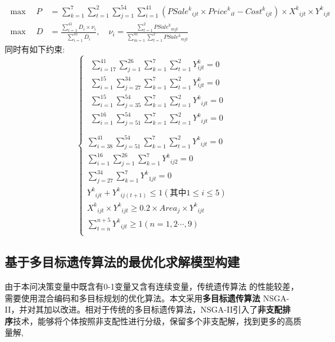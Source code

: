 \documentclass[withoutpreface,bwprint]{cumcmthesis} %
\begin{document}
\begin{align}
	\max \quad P &= \sum_{k=1}^7 \sum_{t=1}^2 \sum_{j=1}^{54} \sum_{i=1}^{41} \left( {PSale^k}_{ijt} \times {Price^k}_{it} - {Cost^k}_{ijt} \right) \times {X^k}_{ijt} \times {Y^k}_{ijt} \\
	\max \quad D &= \frac{\sum_{i=1}^{41} D_i \times \nu_i}{\sum_{i=1}^{41} D_i}, \quad \nu_i = \frac{\sum_{t=1}^2 {PSale^k}_{mjt}}{\sum_{m=1}^{41} \sum_{t=1}^2 {PSale^k}_{mjt}}
\end{align}
同时有如下约束:
\begin{equation}
	\left\{ \begin{array}{c}
		\begin{array}{l}
			\sum_{i=17}^{41}{\sum_{j=1}^{26}{\sum_{k=1}^7{\sum_{t=1}^2{Y_{ijt}^{k}=0}}}}\\
			\sum_{i=1}^{15}{\sum_{j=27}^{34}{\sum_{k=1}^7{\sum_{t=1}^2{Y_{ijt}^{k}=0}}}}\\
			\sum_{i=1}^{15}{\sum_{j=35}^{54}{\sum_{k=1}^7{\sum_{t=1}^2{{Y^k}_{ijt}=0}}}}\\
			\sum_{i=1}^{16}{\sum_{j=51}^{54}{\sum_{k=1}^7{\sum_{t=1}^2{{Y^k}_{ijt}=0}}}}\\
		\end{array}\\
		\sum_{i=38}^{41}{\sum_{j=51}^{54}{\sum_{k=1}^7{\sum_{t=1}^2{{Y^k}_{ijt}=0}}}}\\
		\sum_{i=1}^{16}{\sum_{j=1}^{26}{\sum_{k=1}^7{{Y^k}_{ij2}=0}}}\\
		\sum_{j=27}^{34}{\sum_{k=1}^7{{Y^k}_{1jt}=0}}\\
		{Y^k}_{ijt}+{Y^k}_{ij\left( t+1 \right)}\le 1\left( \text{其中}1\leqslant i\leqslant 5 \right)\\
		{X^k}_{ijt}\times {Y^k}_{ijt}\geqslant 0.2\times Area_j\times {Y^k}_{ijt}\\
		\sum_{t=n}^{n+5}{{Y^k}_{ijt}}\geqslant 1(n=1,2\cdots ,9)\\
	\end{array} \right. 
\end{equation}

\subsection{基于多目标遗传算法的最优化求解模型构建}

由于本问决策变量中既含有0-1变量又含有连续变量，传统遗传算法
的性能较差，需要使用混合编码和多目标规划的优化算法。本文采用\textbf{多目标遗传算法}
NSGA-II，并对其加以改进。相对于传统的多目标遗传算法，NSGA-II引入了\textbf{非支配排
序}技术，能够将个体按照非支配性进行分级，保留多个非支配解，找到更多的高质量解,
\end{document}
